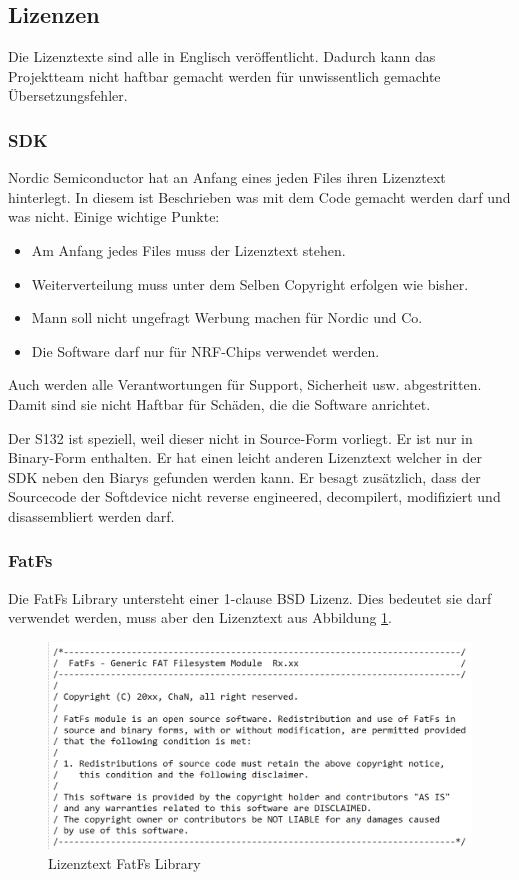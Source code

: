 \subsection{Lizenzen}\label{sec:lizenzen}
Die Lizenztexte sind alle in Englisch veröffentlicht. Dadurch kann das Projektteam nicht haftbar gemacht werden für unwissentlich gemachte Übersetzungsfehler.

\subsubsection*{SDK}
Nordic Semiconductor hat an Anfang eines jeden Files ihren Lizenztext \cite{nordic_sdk_license} hinterlegt. In diesem ist Beschrieben was mit dem Code gemacht werden darf und was nicht. Einige wichtige Punkte:

\begin{itemize}
	\item Am Anfang jedes Files muss der Lizenztext stehen.
	\item Weiterverteilung muss unter dem Selben Copyright erfolgen wie bisher.
	\item Mann soll nicht ungefragt Werbung machen für Nordic und Co.
	\item Die Software darf nur für NRF-Chips verwendet werden.
\end{itemize}

Auch werden alle Verantwortungen für Support, Sicherheit usw. abgestritten. Damit sind sie nicht Haftbar für Schäden, die die Software anrichtet.

Der S132 ist speziell, weil dieser nicht in Source-Form vorliegt. Er ist nur in Binary-Form enthalten. Er hat einen leicht anderen Lizenztext welcher in der SDK neben den Biarys gefunden werden kann. Er besagt zusätzlich, dass der Sourcecode der Softdevice nicht reverse engineered, decompilert, modifiziert und disassembliert werden darf.

\subsubsection{FatFs}
Die FatFs Library untersteht einer 1-clause BSD Lizenz. Dies bedeutet sie darf verwendet werden, muss aber den Lizenztext aus Abbildung \ref{fig Lizenztext FatFs}.


\begin{figure}[ht!]
\includegraphics[width = 140mm]{data/Lizenztext_FatFs.png}
\caption{Lizenztext FatFs Library}
\label{fig Lizenztext FatFs}
\end{figure}

